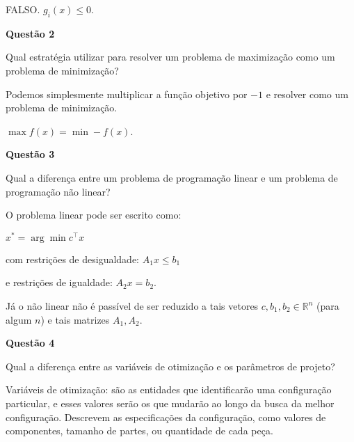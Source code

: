 \documentclass{rbfin}
\begin{document}
FALSO. $g_i(x) \le 0$.

\vspace{6mm}

\large

\textbf{Questão 2} 

\normalsize

\vspace{6mm}

Qual estratégia utilizar para resolver um problema de maximização como um problema de minimização?

\vspace{3mm}

Podemos simplesmente multiplicar a função objetivo por $-1$ e resolver como um problema de minimização.

$\max f (x) = \min - f (x)$.

\newpage

\large

\textbf{Questão 3}

\normalsize

\vspace{6mm}

Qual a diferença entre um problema de programação linear e um problema de programação não linear?

\vspace{3mm}

O problema linear pode ser escrito como:

$x^* = \arg \min c^\top x$

com restrições de desigualdade: $A_1 x \le b_1$

e restrições de igualdade: $A_2 x = b_2$.

Já o não linear não é passível de ser reduzido a tais vetores $c, b_1, b_2 \in \mathbb{R}^n$ (para algum $n$) e tais matrizes $A_1, A_2$.

\vspace{6mm}

\large

\textbf{Questão 4}

\normalsize

\vspace{6mm}

Qual a diferença entre as variáveis de otimização e os parâmetros de projeto?

\vspace{3mm}

Variáveis de otimização: são as entidades que identificarão
uma configuração particular, e esses valores serão os que mudarão
ao longo da busca da melhor configuração. Descrevem as especificações da configuração, como valores de componentes,
tamanho de partes, ou quantidade de cada peça.
\end{document}
